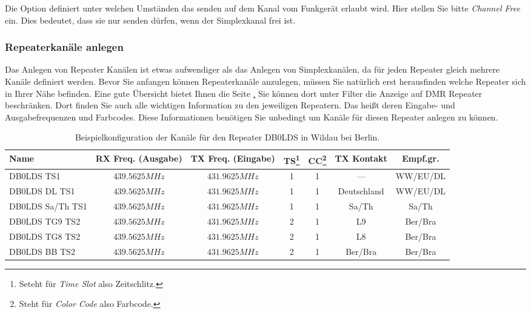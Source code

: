 Die Option  definiert unter welchen Umständen das senden auf dem Kanal vom Funkgerät erlaubt wird. Hier stellen Sie bitte \emph{Channel Free} ein. Dies bedeutet, dass sie nur senden dürfen, wenn der Simplexkanal frei ist.  

\subsubsection{Repeaterkanäle anlegen}
Das Anlegen von Repeater Kanälen ist etwas aufwendiger als das Anlegen von Simplexkanälen, da für jeden Repeater gleich mehrere Kanäle definiert werden. Bevor Sie anfangen können Repeaterkanäle anzulegen, müssen Sie natürlich erst herausfinden welche Repeater sich in Ihrer Nähe befinden. Eine gute Übersicht bietet Ihnen die Seite \href{https://repeatermap.de/}. Sie können dort unter Filter die Anzeige auf DMR Repeater beschränken. Dort finden Sie auch alle wichtigen Information zu den jeweiligen Repeatern. Das heißt deren Eingabe- und Ausgabefrequenzen und Farbcodes. Diese Informationen benötigen Sie unbedingt um Kanäle für diesen Repeater anlegen zu können.

\begin{sidewaystable}[p]
 \centering
 \begin{tabular}{|l|c|c|c|c|c|c|} \hline
  Name             & RX Freq. (Ausgabe) & TX Freq. (Eingabe) & TS\footnote{Seteht für \emph{Time Slot} also Zeitschlitz.} & CC\footnote{Steht für \emph{Color Code} also Farbcode.} & TX Kontakt & Empf.gr. \\ \hline
  DB0LDS TS1       & $439.5625 MHz$ & $431.9625 MHz$ & 1 & 1 & ---         & WW/EU/DL \\
  DB0LDS DL TS1    & $439.5625 MHz$ & $431.9625 MHz$ & 1 & 1 & Deutschland & WW/EU/DL \\
  DB0LDS Sa/Th TS1 & $439.5625 MHz$ & $431.9625 MHz$ & 1 & 1 & Sa/Th       & Sa/Th \\
  DB0LDS TG9 TS2    & $439.5625 MHz$ & $431.9625 MHz$ & 2 & 1 & L9          & Ber/Bra \\
  DB0LDS TG8 TS2    & $439.5625 MHz$ & $431.9625 MHz$ & 2 & 1 & L8          & Ber/Bra \\
  DB0LDS BB TS2    & $439.5625 MHz$ & $431.9625 MHz$ & 2 & 1 & Ber/Bra     & Ber/Bra \\ \hline
 \end{tabular}
 \caption{Beispielkonfiguration der Kanäle für den Repeater DB0LDS in Wildau bei Berlin.} \label{tab:ch:repeater}
\end{sidewaystable}

